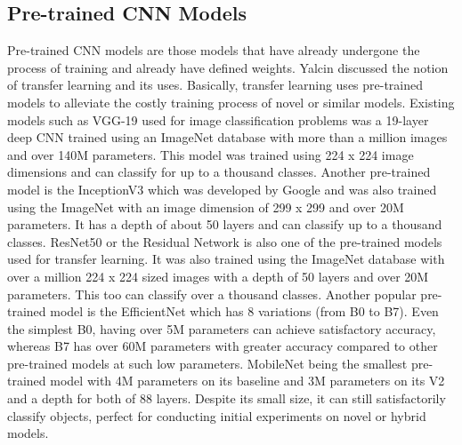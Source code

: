 \subsection{Pre-trained CNN Models}
Pre-trained CNN models are those models that have already undergone the process of training and already have defined weights. Yalcin \cite{yalcn-2021} discussed the notion of transfer learning and its uses. Basically, transfer learning uses pre-trained models to alleviate the costly training process of novel or similar models. Existing models such as VGG-19 \cite{simonyan2015deep} used for image classification problems \cite{bansal-2021} was a 19-layer deep CNN trained using an ImageNet database with more than a million images and over 140M parameters. This model was trained using 224 x 224 image dimensions and can classify for up to a thousand classes. Another pre-trained model is the InceptionV3 \cite{Szegedy_2015_CVPR} which was developed by Google and was also trained using the ImageNet with an image dimension of 299 x 299 and over 20M parameters. It has a depth of about 50 layers and can classify up to a thousand classes. ResNet50 \cite{He_2016_CVPR} or the Residual Network is also one of the pre-trained models used for transfer learning. It was also trained using the ImageNet database with over a million 224 x 224 sized images with a depth of 50 layers and over 20M parameters. This too can classify over a thousand classes. Another popular pre-trained model is the EfficientNet \cite{pmlr-v97-tan19a} which has 8 variations (from B0 to B7). Even the simplest B0, having over 5M parameters can achieve satisfactory accuracy, whereas B7 has over 60M parameters with greater accuracy compared to other pre-trained models at such low parameters. MobileNet \cite{howard2017mobilenets} being the smallest pre-trained model with 4M parameters on its baseline and 3M parameters on its V2 and a depth for both of 88 layers. Despite its small size, it can still satisfactorily classify objects, perfect for conducting initial experiments on novel or hybrid models.
